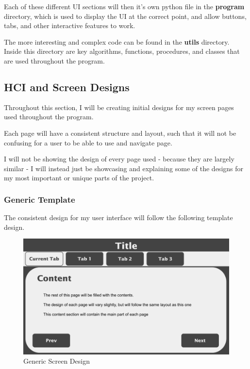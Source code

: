 \documentclass[12pt]{article}
\begin{document}
Each of these different UI sections will then it's own python file in the \textbf{program} directory, which is used to display the UI at the correct point, and allow buttons, tabs, and other interactive features to work.

The more interesting and complex code can be found in the \textbf{utils} directory. Inside this directory are key algorithms, functions, procedures, and classes that are used throughout the program.

\clearpage

\subsection{HCI and Screen Designs}
Throughout this section, I will be creating initial designs for my screen pages used throughout the program.

Each page will have a consistent structure and layout, such that it will not be confusing for a user to be able to use and navigate page.

I will not be showing the design of every page used - because they are largely similar - I will instead just be showcasing and explaining some of the designs for my most important or unique parts of the project.

\subsubsection{Generic Template}
The consistent design for my user interface will follow the following template design.

\begin{figure}[ht]
    \centering
    \includegraphics[scale=0.3]{template-screen-design}
    \caption{Generic Screen Design}
\end{figure}
\end{document}
